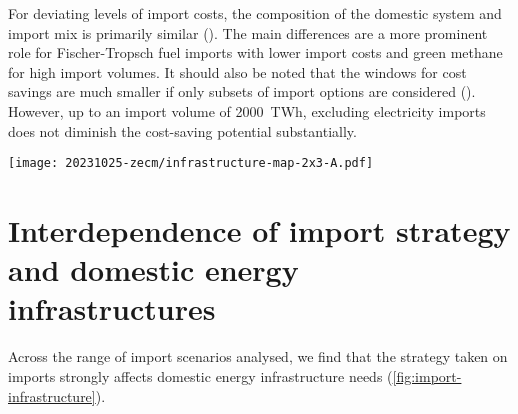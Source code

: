 
For deviating levels of import costs, the composition of the domestic system and import mix is primarily similar (). The main differences are a more prominent role for Fischer-Tropsch fuel imports with lower import costs and green methane for high import volumes. It should also be noted that the windows for cost savings are much smaller if only subsets of import options are considered (). However, up to an import volume of 2000~TWh, excluding electricity imports does not diminish the cost-saving potential substantially.

\begin{figure*}
    \texttt{[image: 20231025-zecm/infrastructure-map-2x3-A.pdf]}
    \caption{\textbf{Layout of European energy infrastructure for different import scenarios.}
        Left column shows the regional electricity supply mix (pies), added HVDC and HVAC transmission capacity (lines), and the siting of battery storage (choropleth).
        Right column shows the hydrogen supply (top half of pies) and consumption (bottom half of pies), net flow and direction of hydrogen in newly built pipelines (lines), and the siting of hydrogen storage subject to geological potentials (choropleth).
        Total volumes of transmission expansion are given in TWkm, which is the sum product of the capacity and length of individual connections.
    }
    \label{fig:import-infrastructure}
\end{figure*}

\section*{Interdependence of import strategy and domestic energy infrastructures}

Across the range of import scenarios analysed, we find that the strategy taken
on imports strongly affects domestic energy infrastructure needs
(\cref{fig:import-infrastructure}).


